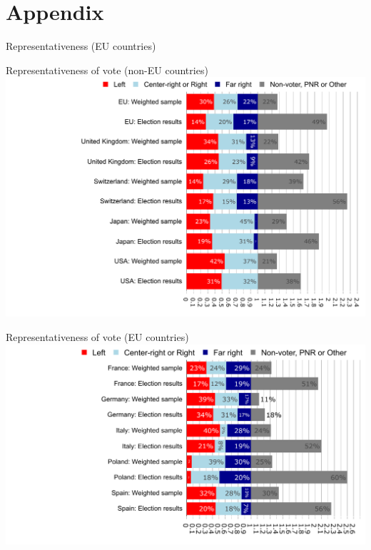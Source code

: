 \documentclass[aspectratio=169,xcolor=dvipsnames, 11pt,mathserif]{beamer}
\begin{document}
\appendix 
\section{Appendix}

\begin{frame}{Representativeness (EU countries) \hyperlink{data}{} \label{representativeness}}
    \vspace{-.6cm}
    \begin{table}[h]
        \makebox[\textwidth][c]{
            \resizebox*{!}{.97\textheight}{
            
            }
        }
    \end{table}  
\end{frame}

\begin{frame}{Representativeness of vote (non-EU countries)  \hyperlink{data}{}}
\includegraphics[width=\textwidth]{../figures/country_comparison/vote_non_EU_pnr_out.pdf}
\end{frame}

\begin{frame}{Representativeness of vote (EU countries)  \hyperlink{data}{}}
\includegraphics[width=\textwidth]{../figures/country_comparison/vote_EU_pnr_out.pdf}
\end{frame}
\end{document}

